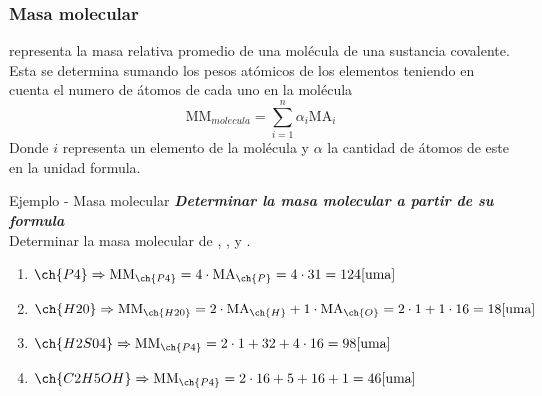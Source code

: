 \subsubsection*{Masa molecular}
representa la masa relativa promedio de una molécula de una sustancia covalente. Esta se determina sumando los pesos atómicos de los elementos teniendo en cuenta el numero de átomos de cada  uno en la molécula
$$ \text{MM}_{molecula}= \sum_{i=1}^{n} \alpha_i\text{MA}_i $$
Donde $i$ representa un elemento de la molécula y $\alpha$ la cantidad de átomos de este en la unidad formula.
\begin{Example*} {Ejemplo - Masa molecular}
	\textbf{\textit{Determinar la masa molecular a partir de su formula}} \\
	Determinar la masa molecular de , ,  y .
	\begin{enumerate}
		\item $\ch{P4}\Rightarrow\text{MM}_{\ch{P4}}=4\cdot\text{MA}_{\ch{P}}=4\cdot31=124[\text{uma}]$
		\item $\ch{H20}\Rightarrow\text{MM}_{\ch{H20}}=2\cdot\text{MA}_{\ch{H}}+1\cdot\text{MA}_{\ch{O}}=2\cdot1+1\cdot16=18[\text{uma}]$
		\item $\ch{H2S04}\Rightarrow\text{MM}_{\ch{P4}}=2\cdot1+32+4\cdot16=98[\text{uma}]$
		\item $\ch{C2H5OH}\Rightarrow\text{MM}_{\ch{P4}}=2\cdot16+5+16+1=46[\text{uma}]$
	\end{enumerate}
\end{Example*}

